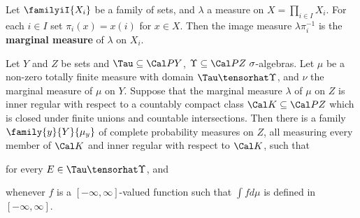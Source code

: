  Let $\familyiI{X_i}$ be a family of sets, and
$\lambda$ a measure on $X=\prod_{i\in I}X_i$.   For each $i\in I$ set
$\pi_i(x)=x(i)$ for $x\in X$.   Then the image measure
$\lambda\pi_i^{-1}$ is the {\bf marginal measure} of $\lambda$ on $X_i$.

 Let $Y$ and $Z$ be sets and
$\Tau\subseteq\Cal PY$, $\Upsilon\subseteq\Cal PZ\,\,\sigma$-algebras.
Let $\mu$ be a
non-zero totally finite measure with domain $\Tau\tensorhat\Upsilon$,
and $\nu$ the marginal measure of $\mu$ on $Y$.   Suppose that the
marginal measure $\lambda$ of $\mu$ on $Z$ is inner regular with respect
to a
countably compact class $\Cal K\subseteq\Cal PZ$ which is closed under
finite unions and countable intersections.   Then there is a family
$\family{y}{Y}{\mu_y}$ of complete probability measures on $Z$, all
measuring every member of $\Cal K$ and inner regular with respect to
$\Cal K$, such that


\noindent for every $E\in\Tau\tensorhat\Upsilon$, and


\noindent whenever $f$ is a $[-\infty,\infty]$-valued function such that
$\int fd\mu$ is defined in $[-\infty,\infty]$.

